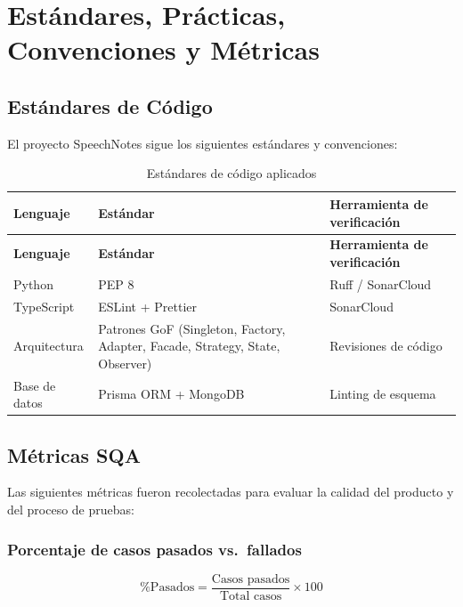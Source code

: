 \chapter{Estándares, Prácticas, Convenciones y Métricas}
\label{sec:estandares}

\section{Estándares de Código}
\label{sec:estandares-codigo}

El proyecto SpeechNotes sigue los siguientes estándares y convenciones:

\begin{longtable}{lp{4cm}p{6cm}}
\caption{Estándares de código aplicados}
\label{tab:estandares-codigo}\\
\toprule
\textbf{Lenguaje} & \textbf{Estándar} & \textbf{Herramienta de verificación}\\
\midrule
\endfirsthead
\toprule
\textbf{Lenguaje} & \textbf{Estándar} & \textbf{Herramienta de verificación}\\
\midrule
\endhead
\bottomrule
\endfoot

Python & PEP 8 & Ruff / SonarCloud\\

TypeScript & ESLint + Prettier & SonarCloud\\

Arquitectura & Patrones GoF (Singleton, Factory, Adapter, Facade, Strategy, State, Observer) & Revisiones de código\\

Base de datos & Prisma ORM + MongoDB & Linting de esquema\\

\end{longtable}

\section{Métricas SQA}
\label{sec:metricas}

Las siguientes métricas fueron recolectadas para evaluar la calidad del producto y del proceso de pruebas:

\subsection{Porcentaje de casos pasados vs.\ fallados}
\label{subsec:porcentaje-casos}

\[
\%\text{Pasados} = \frac{\text{Casos pasados}}{\text{Total casos}} \times 100
\]


